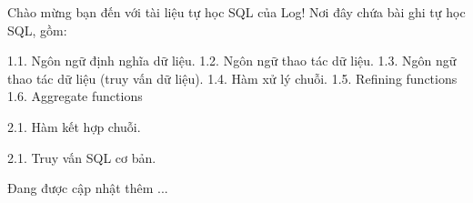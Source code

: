 Chào mừng bạn đến với tài liệu tự học SQL của Log! Nơi đây chứa bài ghi tự học SQL, gồm:

1.1. Ngôn ngữ định nghĩa dữ liệu.
1.2. Ngôn ngữ thao tác dữ liệu.
1.3. Ngôn ngữ thao tác dữ liệu (truy vấn dữ liệu).
1.4. Hàm xử lý chuỗi.
1.5. Refining functions
1.6. Aggregate functions

2.1. Hàm kết hợp chuỗi.

2.1. Truy vấn SQL cơ bản.

Đang được cập nhật thêm ...
